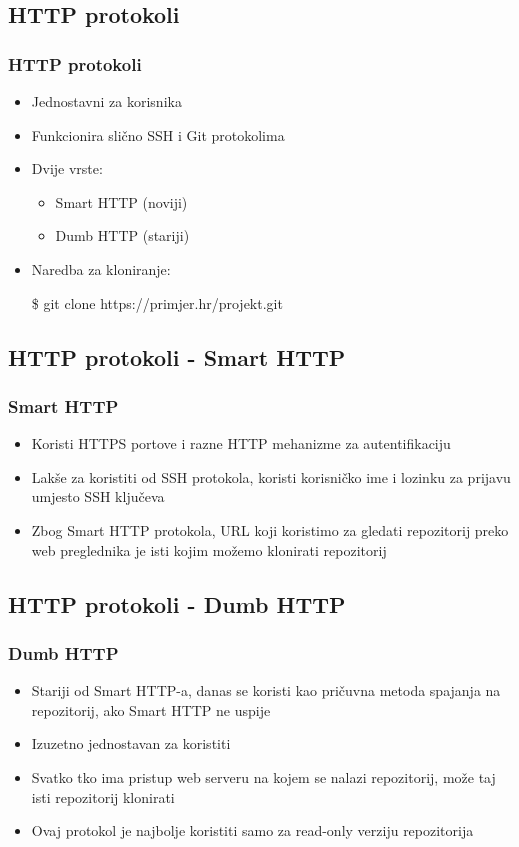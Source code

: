 \subsection{HTTP protokoli}

\begin{frame}
\frametitle{HTTP protokoli}
\begin{itemize}
	\item Jednostavni za korisnika
	\item Funkcionira slično SSH i Git protokolima
	\item Dvije vrste:
	\begin{itemize}
		\item Smart HTTP (noviji)
		\item Dumb HTTP (stariji)
	\end{itemize}
	\item Naredba za kloniranje:

	\$ git clone https://primjer.hr/projekt.git
\end{itemize}
\end{frame}


\subsection{HTTP protokoli - Smart HTTP}
\begin{frame}
\frametitle{Smart HTTP}
\begin{itemize}
	\item Koristi HTTPS portove i razne HTTP mehanizme za autentifikaciju
	\item Lakše za koristiti od SSH protokola, koristi korisničko ime i lozinku za prijavu umjesto SSH ključeva
	\item Zbog Smart HTTP protokola, URL koji koristimo za gledati repozitorij preko web preglednika je isti kojim možemo klonirati repozitorij
\end{itemize}
\end{frame}


\subsection{HTTP protokoli - Dumb HTTP}
\begin{frame}
\frametitle{Dumb HTTP}
\begin{itemize}
	\item Stariji od Smart HTTP-a, danas se koristi kao pričuvna metoda spajanja na repozitorij, ako Smart HTTP ne uspije
	\item Izuzetno jednostavan za koristiti
	\item Svatko tko ima pristup web serveru na kojem se nalazi repozitorij, može taj isti repozitorij klonirati
	\item Ovaj protokol je najbolje koristiti samo za read-only verziju repozitorija
\end{itemize}
\end{frame}